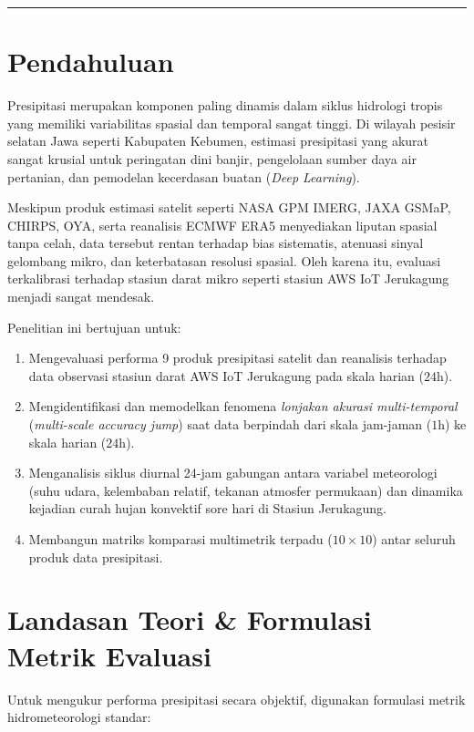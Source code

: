 \documentclass[11pt,a4paper]{article}
\begin{document}
\vspace{0.4cm}
\hrule
\vspace{0.4cm}

\section{Pendahuluan}
Presipitasi merupakan komponen paling dinamis dalam siklus hidrologi tropis yang memiliki variabilitas spasial dan temporal sangat tinggi. Di wilayah pesisir selatan Jawa seperti Kabupaten Kebumen, estimasi presipitasi yang akurat sangat krusial untuk peringatan dini banjir, pengelolaan sumber daya air pertanian, dan pemodelan kecerdasan buatan (\textit{Deep Learning}). 

Meskipun produk estimasi satelit seperti NASA GPM IMERG, JAXA GSMaP, CHIRPS, OYA, serta reanalisis ECMWF ERA5 menyediakan liputan spasial tanpa celah, data tersebut rentan terhadap bias sistematis, atenuasi sinyal gelombang mikro, dan keterbatasan resolusi spasial. Oleh karena itu, evaluasi terkalibrasi terhadap stasiun darat mikro seperti stasiun AWS IoT Jerukagung menjadi sangat mendesak.

Penelitian ini bertujuan untuk:
\begin{enumerate}[leftmargin=*]
    \item Mengevaluasi performa 9 produk presipitasi satelit dan reanalisis terhadap data observasi stasiun darat AWS IoT Jerukagung pada skala harian ($24\text{h}$).
    \item Mengidentifikasi dan memodelkan fenomena \textit{lonjakan akurasi multi-temporal} (\textit{multi-scale accuracy jump}) saat data berpindah dari skala jam-jaman ($1\text{h}$) ke skala harian ($24\text{h}$).
    \item Menganalisis siklus diurnal 24-jam gabungan antara variabel meteorologi (suhu udara, kelembaban relatif, tekanan atmosfer permukaan) dan dinamika kejadian curah hujan konvektif sore hari di Stasiun Jerukagung.
    \item Membangun matriks komparasi multimetrik terpadu ($10 \times 10$) antar seluruh produk data presipitasi.
\end{enumerate}

\section{Landasan Teori \& Formulasi Metrik Evaluasi}
Untuk mengukur performa presipitasi secara objektif, digunakan formulasi metrik hidrometeorologi standar:
\end{document}
